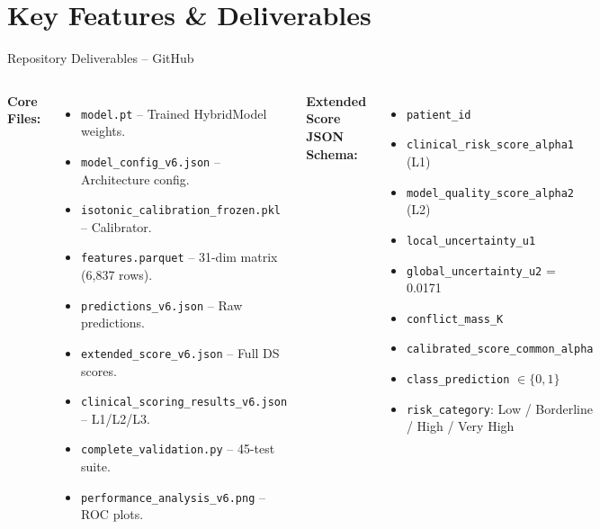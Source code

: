 \documentclass[aspectratio=169]{beamer}
\begin{document}
\section{Key Features \& Deliverables}

\begin{frame}{Repository Deliverables -- GitHub}
  \begin{columns}[T]
      \textbf{Core Files:}
      \begin{itemize}\small
        \item \texttt{model.pt} -- Trained HybridModel weights.
        \item \texttt{model\_config\_v6.json} -- Architecture config.
        \item \texttt{isotonic\_calibration\_frozen.pkl} -- Calibrator.
        \item \texttt{features.parquet} -- 31-dim matrix (6,837 rows).
        \item \texttt{predictions\_v6.json} -- Raw predictions.
        \item \texttt{extended\_score\_v6.json} -- Full DS scores.
        \item \texttt{clinical\_scoring\_results\_v6.json} -- L1/L2/L3.
        \item \texttt{complete\_validation.py} -- 45-test suite.
        \item \texttt{performance\_analysis\_v6.png} -- ROC plots.
      \end{itemize}
      \textbf{Extended Score JSON Schema:}
      \begin{itemize}\small
        \item \texttt{patient\_id}
        \item \texttt{clinical\_risk\_score\_alpha1} (L1)
        \item \texttt{model\_quality\_score\_alpha2} (L2)
        \item \texttt{local\_uncertainty\_u1}
        \item \texttt{global\_uncertainty\_u2} = 0.0171
        \item \texttt{conflict\_mass\_K}
        \item \texttt{calibrated\_score\_common\_alpha}
        \item \texttt{class\_prediction} $\in\{0,1\}$
        \item \texttt{risk\_category}: Low / Borderline / High / Very High
      \end{itemize}
  \end{columns}
\end{frame}
\end{document}
